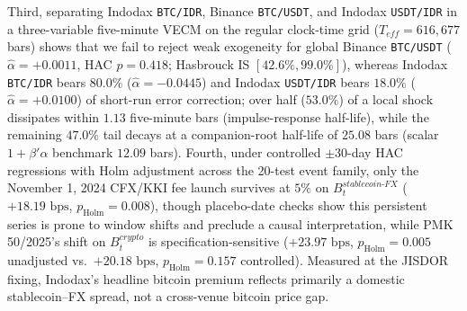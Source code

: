 Third, separating Indodax \texttt{BTC/IDR}, Binance \texttt{BTC/USDT}, and Indodax \texttt{USDT/IDR} in a three-variable five-minute VECM on the regular clock-time grid ($T_{eff} = 616,677$ bars) shows that we fail to reject weak exogeneity for global Binance \texttt{BTC/USDT} ($\hat{\alpha} = +0.0011$, HAC $p = 0.418$; Hasbrouck IS $[42.6\%, 99.0\%]$), whereas Indodax \texttt{BTC/IDR} bears $80.0\%$ ($\hat{\alpha} = -0.0445$) and Indodax \texttt{USDT/IDR} bears $18.0\%$ ($\hat{\alpha} = +0.0100$) of short-run error correction; over half ($53.0\%$) of a local shock dissipates within $1.13$ five-minute bars (impulse-response half-life), while the remaining $47.0\%$ tail decays at a companion-root half-life of $25.08$ bars (scalar $1+\beta'\alpha$ benchmark $12.09$ bars). Fourth, under controlled $\pm 30$-day HAC regressions with Holm adjustment across the 20-test event family, only the November 1, 2024 CFX/KKI fee launch survives at $5\%$ on $B_t^{stablecoin\text{-}FX}$ ($+18.19\text{ bps}$, $p_{\text{Holm}} = 0.008$), though placebo-date checks show this persistent series is prone to window shifts and preclude a causal interpretation, while PMK 50/2025's shift on $B_t^{crypto}$ is specification-sensitive ($+23.97\text{ bps}$, $p_{\text{Holm}} = 0.005$ unadjusted vs.\ $+20.18\text{ bps}$, $p_{\text{Holm}} = 0.157$ controlled). Measured at the JISDOR fixing, Indodax's headline bitcoin premium reflects primarily a domestic stablecoin--FX spread, not a cross-venue bitcoin price gap.

